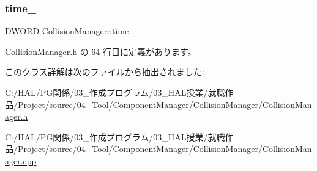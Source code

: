 \mbox{\label{class_collision_manager_a6520ff69c7035e61267998885669d960}} 
\subsubsection{\texorpdfstring{time\+\_\+}{time\_}}
{\footnotesize\ttfamily D\+W\+O\+RD Collision\+Manager\+::time\+\_\+\hspace{0.3cm}{\ttfamily [private]}}



 Collision\+Manager.\+h の 64 行目に定義があります。



このクラス詳解は次のファイルから抽出されました\+:\begin{DoxyCompactItemize}
\item 
C\+:/\+H\+A\+L/\+P\+G関係/03\+\_\+作成プログラム/03\+\_\+\+H\+A\+L授業/就職作品/\+Project/source/04\+\_\+\+Tool/\+Component\+Manager/\+Collision\+Manager/\mbox{\hyperlink{_collision_manager_8h}{Collision\+Manager.\+h}}\item 
C\+:/\+H\+A\+L/\+P\+G関係/03\+\_\+作成プログラム/03\+\_\+\+H\+A\+L授業/就職作品/\+Project/source/04\+\_\+\+Tool/\+Component\+Manager/\+Collision\+Manager/\mbox{\hyperlink{_collision_manager_8cpp}{Collision\+Manager.\+cpp}}\end{DoxyCompactItemize}
